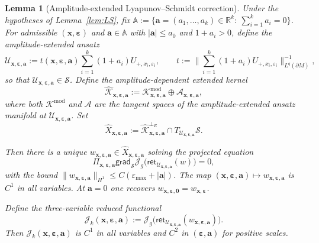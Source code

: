 \documentclass[11pt,reqno,a4paper]{amsart}
\numberwithin{equation}{section}
\theoremstyle{plain}
\newtheorem{lemma}[theorem]{Lemma}
\theoremstyle{remark}
\theoremstyle{plain}
\begin{document}
\begin{lemma}[Amplitude-extended Lyapunov--Schmidt correction]\label{lem:LS-extended}
Under the hypotheses of Lemma~\ref{lem:LS}, fix
$\mathbb A
:=\{\mathbf a=(a_1,\dots,a_k)\in\mathbb R^k:\ \sum_{i=1}^k a_i=0\}$.
For admissible $(\mathbf x,\boldsymbol\varepsilon)$ and $\mathbf a\in\mathbb A$ with
$|\mathbf a|\le a_0$ and $1+a_i>0$, define the amplitude-extended ansatz
\[
\mathcal U_{\mathbf x,\boldsymbol\varepsilon,\mathbf a}
:= t(\mathbf x,\boldsymbol\varepsilon,\mathbf a)\sum_{i=1}^k (1+a_i)U_{+,x_i,\varepsilon_i},
\qquad
t:=\Big\|\sum_{i=1}^k (1+a_i)U_{+,x_i,\varepsilon_i}\Big\|_{L^q(\partial M)}^{-1},
\]
so that $\mathcal U_{\mathbf x,\boldsymbol\varepsilon,\mathbf a}\in\mathcal S$.
Define the amplitude-dependent extended kernel
\[
\widehat{\mathcal K}_{\mathbf x,\boldsymbol\varepsilon,\mathbf a}
:=\mathcal K^{\mathrm{mod}}_{\mathbf x,\boldsymbol\varepsilon,\mathbf a}
\oplus\mathcal A_{\mathbf x,\boldsymbol\varepsilon,\mathbf a},
\]
where both $\mathcal K^{\mathrm{mod}}$ and $\mathcal A$ are the tangent spaces of the
amplitude-extended ansatz manifold at
$\mathcal U_{\mathbf x,\boldsymbol\varepsilon,\mathbf a}$.
Set
\[
\widehat X_{\mathbf x,\boldsymbol\varepsilon,\mathbf a}
:=\widehat{\mathcal K}_{\mathbf x,\boldsymbol\varepsilon,\mathbf a}^{\perp_E}
\cap T_{\mathcal U_{\mathbf x,\boldsymbol\varepsilon,\mathbf a}}\mathcal S.
\]

Then there is a unique
$w_{\mathbf x,\boldsymbol\varepsilon,\mathbf a}\in\widehat X_{\mathbf x,\boldsymbol\varepsilon,\mathbf a}$
solving the projected equation
\[
\Pi_{\mathbf x,\boldsymbol\varepsilon,\mathbf a}
\mathsf{grad}_{\mathcal S}\mathcal J_g\big(
\mathsf{ret}_{\mathcal U_{\mathbf x,\boldsymbol\varepsilon,\mathbf a}}
(w)\big)=0,
\]
with the bound
$\|w_{\mathbf x,\boldsymbol\varepsilon,\mathbf a}\|_{H^1}
\le C(\varepsilon_{\max}+|\mathbf a|)$.
The map
$(\mathbf x,\boldsymbol\varepsilon,\mathbf a)\mapsto
w_{\mathbf x,\boldsymbol\varepsilon,\mathbf a}$
is $C^1$ in all variables.
At $\mathbf a=0$ one recovers
$w_{\mathbf x,\boldsymbol\varepsilon,\mathbf 0}
=w_{\mathbf x,\boldsymbol\varepsilon}$.

Define the \emph{three-variable reduced functional}
\begin{equation}\label{eq:Jk-3var}
\mathcal J_k(\mathbf x,\boldsymbol\varepsilon,\mathbf a)
:=\mathcal J_g\big(\mathsf{ret}_{\mathcal U_{\mathbf x,\boldsymbol\varepsilon,\mathbf a}}
(w_{\mathbf x,\boldsymbol\varepsilon,\mathbf a})\big).
\end{equation}
Then $\mathcal J_k(\mathbf x,\boldsymbol\varepsilon,\mathbf a)$ is $C^1$ in all variables and $C^2$ in
$(\boldsymbol\varepsilon,\mathbf a)$ for positive scales.
\end{lemma}
\end{document}

